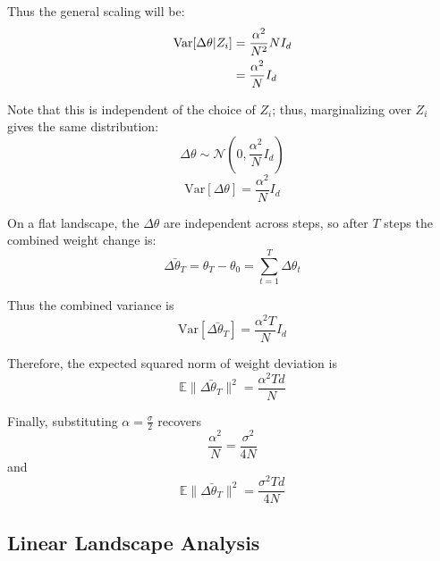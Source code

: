    Thus the general scaling will be:
    \begin{align}
    \mathrm{Var}[\Delta\theta|Z_{i}] &= \frac{\alpha^{2}}{N^{2}}N I_{d} \notag\\
    &= \frac{\alpha^{2}}{N}I_{d}
    \end{align}
    
    Note that this is independent of the choice of $Z_{i}$; thus, marginalizing
    over $Z_{i}$ gives the same distribution:
    \begin{equation}
    \Delta\theta\sim\mathcal{N}\left(0, \frac{\alpha^{2}}{N}I_{d}\right)
    \end{equation}
    \begin{equation}
    \mathrm{Var}[\Delta\theta] = \frac{\alpha^{2}}{N}I_{d}
    \end{equation}
    
    On a flat landscape, the $\Delta\theta$ are independent across
    steps, so after $T$ steps the combined weight change is:
    \begin{equation}
    \bar{\Delta\theta_{T}} = \theta_{T} - \theta_{0} = \sum_{t=1}^{T} \Delta\theta_{t}
    \end{equation}
    
    Thus the combined variance is
    \begin{equation}
    \mathrm{Var}[\bar{\Delta\theta_{T}}] = \frac{\alpha^{2}T}{N}I_{d}
    \end{equation}
    
    Therefore, the expected squared norm of weight deviation is
    \begin{equation}
    \mathbb{E}\|\bar{\Delta\theta_{T}}\|^{2} = \frac{\alpha^{2}Td}{N}
    \end{equation}
    
    Finally, substituting $\alpha = \frac{\sigma}{2}$ recovers
    \begin{equation}
    \frac{\alpha^{2}}{N} = \frac{\sigma^{2}}{4N}
    \end{equation}
    and 
    \begin{equation}
    \mathbb{E}\|\bar{\Delta\theta_{T}}\|^{2} = \frac{\sigma^{2}Td}{4N}
    \end{equation}
    
    
    \subsection{Linear Landscape Analysis}\label{appsec:linear_landscape_step}
    
